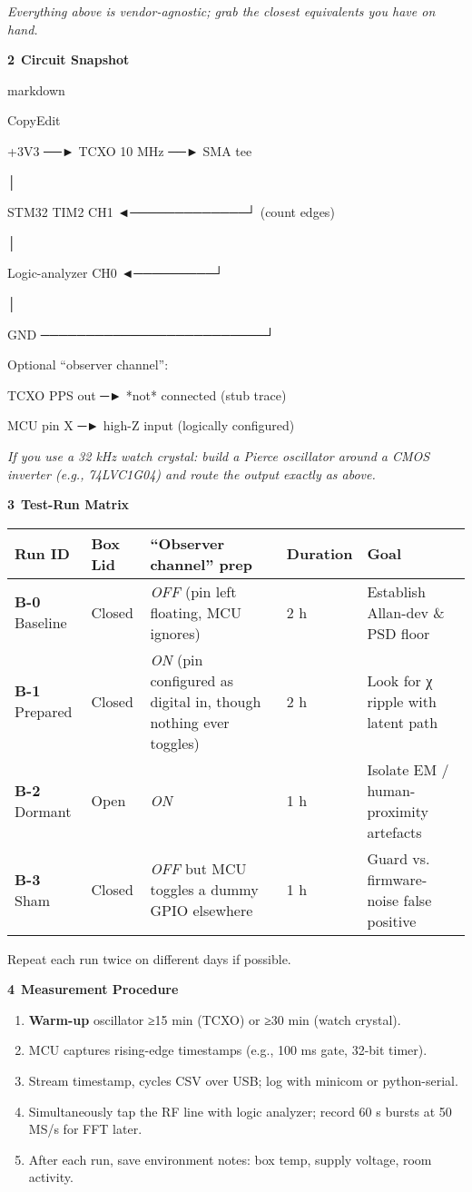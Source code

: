\documentclass[]{article}
\begin{document}
\emph{Everything above is vendor-agnostic; grab the closest equivalents
you have on hand.}

\textbf{2 Circuit Snapshot}

markdown

CopyEdit

+3V3 ──► TCXO 10 MHz ──► SMA tee

│

STM32 TIM2 CH1 ◄─────────────┘ (count edges)

│

Logic-analyzer CH0 ◄─────────┘

│

GND ─────────────────────────┘

Optional ``observer channel'':

TCXO PPS out ─► *not* connected (stub trace)

MCU pin X ─► high-Z input (logically configured)

\emph{If you use a 32 kHz watch crystal: build a Pierce oscillator
around a CMOS inverter (e.g., 74LVC1G04) and route the output exactly as
above.}

\textbf{3 Test-Run Matrix}

\begin{longtable}[]{@{}lllll@{}}
\toprule
\textbf{Run ID} & \textbf{Box Lid} & \textbf{``Observer channel'' prep}
& \textbf{Duration} & \textbf{Goal}\tabularnewline
\midrule
\endhead
\textbf{B-0} Baseline & Closed & \emph{OFF} (pin left floating, MCU
ignores) & 2 h & Establish Allan-dev \& PSD floor\tabularnewline
\textbf{B-1} Prepared & Closed & \emph{ON} (pin configured as digital
in, though nothing ever toggles) & 2 h & Look for χ ripple with latent
path\tabularnewline
\textbf{B-2} Dormant & Open & \emph{ON} & 1 h & Isolate EM /
human-proximity artefacts\tabularnewline
\textbf{B-3} Sham & Closed & \emph{OFF} but MCU toggles a dummy GPIO
elsewhere & 1 h & Guard vs. firmware-noise false positive\tabularnewline
\bottomrule
\end{longtable}

Repeat each run twice on different days if possible.

\textbf{4 Measurement Procedure}

\begin{enumerate}
\def\labelenumi{\arabic{enumi}.}
\item
  \textbf{Warm-up} oscillator ≥15 min (TCXO) or ≥30 min (watch crystal).
\item
  MCU captures rising-edge timestamps (e.g., 100 ms gate, 32-bit timer).
\item
  Stream timestamp, cycles CSV over USB; log with minicom or
  python-serial.
\item
  Simultaneously tap the RF line with logic analyzer; record 60 s bursts
  at 50 MS/s for FFT later.
\item
  After each run, save environment notes: box temp, supply voltage, room
  activity.
\end{enumerate}
\end{document}

